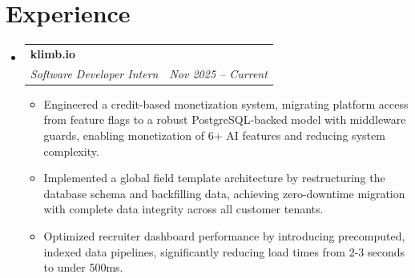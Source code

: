\documentclass[letterpaper,10pt]{article}
\makeatletter
\newenvironment{resumeList}{
  \begin{itemize}[leftmargin=0.15in, label={}]
}{
  \end{itemize}
}
\newcommand{\resumeItem}[1]{
  \item\small{
    {#1 \vspace{-2.5pt}}
  }
}
\newcommand{\resumeSubheading}[4]{
  \vspace{-2pt}\item
    \begin{tabular*}{0.97\textwidth}[t]{l@{\extracolsep{\fill}}r}
      \textbf{#1} & #2 \\
      \textit{\small#3} & \textit{\small #4} \\
    \end{tabular*}\vspace{-6pt}
}
\newcommand{\resumeItemListStart}{\begin{itemize}[leftmargin=0.15in]}
\newcommand{\resumeItemListEnd}{\end{itemize}\vspace{-5pt}}
\makeatother
\begin{document}
\section{Experience}
\begin{resumeList}
    \resumeSubheading
    {klimb.io}{}
    {Software Developer Intern}{Nov 2025 – Current}
  \resumeItemListStart
    \resumeItem{Engineered a credit-based monetization system, migrating platform access from feature flags to a robust PostgreSQL-backed model with middleware guards, enabling monetization of 6+ AI features and reducing system complexity.}
    \resumeItem{Implemented a global field template architecture by restructuring the database schema and backfilling data, achieving zero-downtime migration with complete data integrity across all customer tenants.}
    \resumeItem{Optimized recruiter dashboard performance by introducing precomputed, indexed data pipelines, significantly reducing load times from 2-3 seconds to under 500ms.}
  \resumeItemListEnd
\end{resumeList}

\end{document}
